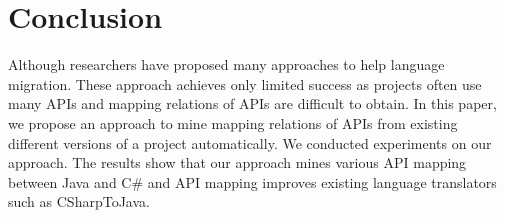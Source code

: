 \section{Conclusion}
\label{sec:colcusion} Although researchers have proposed many
approaches to help language migration. These approach achieves only
limited success as projects often use many APIs and mapping
relations of APIs are difficult to obtain. In this paper, we propose
an approach to mine mapping relations of APIs from existing
different versions of a project automatically. We conducted
experiments on our approach. The results show that our approach
mines various API mapping between Java and C\# and API mapping
improves existing language translators such as CSharpToJava.

